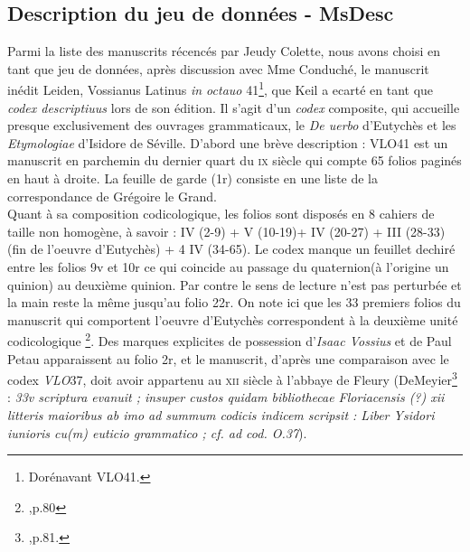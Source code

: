 \documentclass[a4paper, twoside, 12pt]{book}
\begin{document}
\subsection{Description du jeu de données - MsDesc}

Parmi la liste des manuscrits récencés par Jeudy Colette, nous avons choisi en tant que jeu de données, après discussion avec Mme Conduché, le manuscrit inédit  Leiden, Vossianus Latinus \textit{in octauo} 41\footnote{Dorénavant VLO41.}, que Keil a ecarté en tant que \textit{codex descriptiuus} lors de son édition. Il s'agit d'un \textit{codex} composite, qui accueille presque exclusivement des ouvrages grammaticaux, le  \textit{De uerbo} d'Eutychès et les \textit{Etymologiae} d'Isidore de Séville. D'abord une brève description : VLO41 est un manuscrit en parchemin du dernier quart du \textsc{ix}\ieme{} siècle qui compte  65 folios paginés en haut à droite. La feuille de garde (1r) consiste en une liste de la correspondance de Grégoire le Grand.\\

Quant à sa composition codicologique,  les folios sont disposés en 8 cahiers de taille non homogène, à savoir : IV (2-9) + V (10-19)+ IV (20-27) + III (28-33) (fin de l'oeuvre d'Eutychès) + 4 IV (34-65). Le codex manque un feuillet dechiré entre les folios 9v et 10r ce qui coincide au passage du quaternion(à l'origine un quinion) au deuxième quinion. Par contre le sens de lecture n'est pas perturbée et la main reste la même jusqu'au folio 22r. On note ici que les 33 premiers folios du manuscrit qui comportent l'oeuvre d'Eutychès correspondent à la deuxième unité codicologique \footnote{\cite{de1973codices},p.80}. Des marques explicites de possession d'\textit{Isaac Vossius} et de Paul Petau apparaissent au folio 2r, et le manuscrit, d'après une comparaison avec le codex \textit{VLO}37, doit avoir appartenu au \textsc{xii}\ieme{} siècle à l'abbaye de Fleury (DeMeyier\footnote{\cite{de1973codices},p.81.} : \textit{33v scriptura evanuit ; insuper custos quidam bibliothecae Floriacensis (?) xii litteris maioribus ab imo ad summum codicis indicem scripsit : Liber Ysidori iunioris cu(m) euticio grammatico ; cf. ad cod. O.37}).\\
\end{document}
